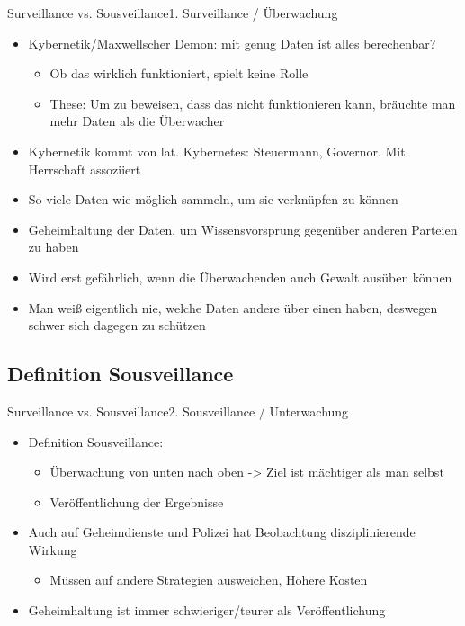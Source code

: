 \documentclass[10pt]{beamer}
\begin{document}
{\begin{frame}{Surveillance vs. Sousveillance}{1. Surveillance / Überwachung}
\begin{itemize}
  \item<1-> Kybernetik/Maxwellscher Demon: mit genug Daten ist alles berechenbar?
  \begin{itemize}
    \item<2-> Ob das wirklich funktioniert, spielt keine Rolle
    \item<2-> These: Um zu beweisen, dass das nicht funktionieren kann, bräuchte man mehr Daten als die Überwacher
  \end{itemize}
  \item<3-> Kybernetik kommt von lat. Kybernetes: Steuermann, Governor. Mit Herrschaft assoziiert
  \item<3-> So viele Daten wie möglich sammeln, um sie verknüpfen zu können
  \item<3-> Geheimhaltung der Daten, um Wissensvorsprung gegenüber anderen Parteien zu haben
  \item<4-> Wird erst gefährlich, wenn die Überwachenden auch Gewalt ausüben können
  \item<4-> Man weiß eigentlich nie, welche Daten andere über einen haben, deswegen schwer sich dagegen zu schützen
\end{itemize}

\end{frame}

\subsection{Definition Sousveillance}
\begin{frame}{Surveillance vs. Sousveillance}{2. Sousveillance / Unterwachung}

\begin{itemize}
  \item<1-> Definition Sousveillance:
  \begin{itemize}
    \item Überwachung von unten nach oben -> Ziel ist mächtiger als man selbst
    \item Veröffentlichung der Ergebnisse
  \end{itemize}
  \item<2-> Auch auf Geheimdienste und Polizei hat Beobachtung disziplinierende Wirkung
  \begin{itemize}
    \item<2-> Müssen auf andere Strategien ausweichen, Höhere Kosten
  \end{itemize}
  \item<2-> Geheimhaltung ist immer schwieriger/teurer als Veröffentlichung
\end{itemize}


\end{frame}}
\end{document}
